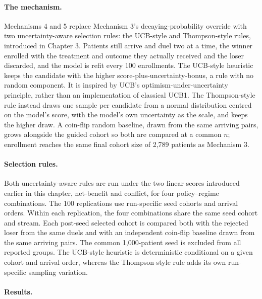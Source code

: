 \paragraph{The mechanism.}
Mechanisms 4 and 5 replace Mechanism 3's decaying-probability override with two
uncertainty-aware selection rules: the UCB-style and Thompson-style rules,
introduced in Chapter 3. Patients still
arrive and duel two at a time, the winner enrolled with the treatment and outcome they
actually received and the loser discarded, and the model is refit every 100 enrollments.
The UCB-style heuristic keeps the candidate with the higher score-plus-uncertainty-bonus,
a rule with no random component. It is inspired by UCB's
optimism-under-uncertainty principle, rather than an implementation of classical UCB1.
The Thompson-style rule instead draws one sample per candidate from a normal
distribution centred on the model's score, with the model's own uncertainty as the scale,
and keeps the higher draw. A coin-flip random baseline, drawn from the same arriving
pairs, grows alongside the guided cohort so both are compared at a common $n$; enrollment
reaches the same final cohort size of 2,789 patients as Mechanism 3.

\paragraph{Selection rules.}
Both uncertainty-aware rules are run under the two linear scores introduced earlier in
this chapter, net-benefit and conflict, for four policy--regime combinations. The 100
replications use run-specific seed cohorts and arrival orders. Within each replication,
the four combinations share the same seed cohort and stream. Each post-seed selected
cohort is compared both with the rejected loser from the same duels and with an
independent coin-flip baseline drawn from the same arriving pairs. The common
1,000-patient seed is excluded from all reported groups. The UCB-style heuristic is
deterministic conditional on a given cohort and arrival order, whereas the Thompson-style
rule adds its own run-specific sampling variation.

\paragraph{Results.}

\begin{table}[htbp]
    \centering
    \small
    \setlength{\tabcolsep}{4pt}
    
    \caption{Bleeding and any-ischaemic-event rates among patients selected by the
guided bandit and the rejected loser from the same duels, by policy and score regime,
averaged over 100 seeded replications. Each post-seed group contains 1,789 patients; the
common 1,000-patient seed is excluded. An ischaemic event denotes the occurrence of at
least one of death, MI or stroke, with each patient counted once. Diff.\ is the
selected-minus-rejected difference; SEM is the standard error of the paired per-run
differences; $p$ is from a paired two-sided Wilcoxon signed-rank test.}
    \label{tab:ch8-bandit-internal-rate-comparison}
\end{table}

